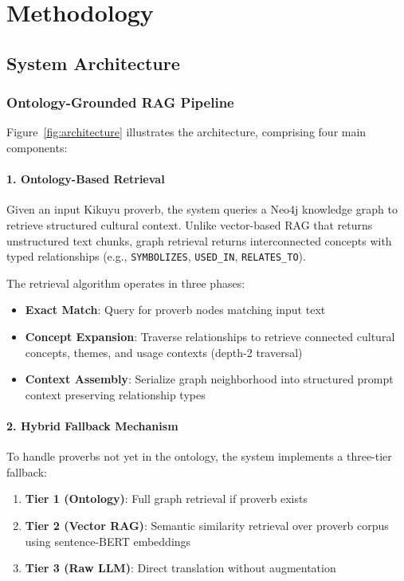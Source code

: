 
\section{Methodology}
\label{sec:methodology}

\subsection{System Architecture}
\label{subsec:architecture}

\subsubsection{Ontology-Grounded RAG Pipeline}

Figure~\ref{fig:architecture} illustrates the \thillmo{} architecture, comprising four main components:

\paragraph{1. Ontology-Based Retrieval} Given an input Kikuyu proverb, the system queries a Neo4j knowledge graph to retrieve structured cultural context. Unlike vector-based RAG that returns unstructured text chunks, graph retrieval returns interconnected concepts with typed relationships (e.g., \texttt{SYMBOLIZES}, \texttt{USED\_IN}, \texttt{RELATES\_TO}).

The retrieval algorithm operates in three phases:
\begin{itemize}
    \item \textbf{Exact Match}: Query for proverb nodes matching input text
    \item \textbf{Concept Expansion}: Traverse relationships to retrieve connected cultural concepts, themes, and usage contexts (depth-2 traversal)
    \item \textbf{Context Assembly}: Serialize graph neighborhood into structured prompt context preserving relationship types
\end{itemize}

\paragraph{2. Hybrid Fallback Mechanism} To handle proverbs not yet in the ontology, the system implements a three-tier fallback:
\begin{enumerate}
    \item \textbf{Tier 1 (Ontology)}: Full graph retrieval if proverb exists
    \item \textbf{Tier 2 (Vector RAG)}: Semantic similarity retrieval over proverb corpus using sentence-BERT embeddings~\cite{reimers2019sentence}
    \item \textbf{Tier 3 (Raw LLM)}: Direct translation without augmentation
\end{enumerate}

